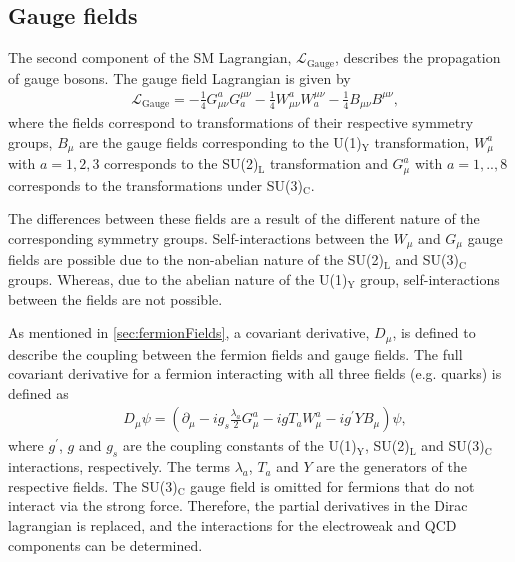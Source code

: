 \subsection{Gauge fields}\label{sec:gaugeFields}
The second component of the SM Lagrangian, $\mathcal{L}_{\mathrm{Gauge}}$, describes the propagation of gauge bosons. The gauge field Lagrangian is given by
\begin{equation}
    \label{eq:lagrangianGauge}
    \begin{aligned}
        & \mathcal{L}_\mathrm{Gauge} = -\frac{1}{4}G^a_{\mu\nu}G_a^{\mu\nu} -\frac{1}{4}W^a_{\mu\nu}W_a^{\mu\nu} -\frac{1}{4}B_{\mu\nu}B^{\mu\nu},
    \end{aligned}
\end{equation}
where the fields correspond to transformations of their respective symmetry groups, $B_\mu$ are the gauge fields corresponding to the U(1)$_\mathrm{Y}$ transformation,  $W_\mu^a$ with $a = 1,2,3$ corresponds to the SU(2)$_\mathrm{L}$ transformation and $G_\mu^a$ with $a = 1,..,8$ corresponds to the transformations under SU(3)$_\mathrm{C}$. 

The differences between these fields are a result of the different nature of the corresponding symmetry groups. Self-interactions between the $W_\mu$ and $G_\mu$ gauge fields are possible due to the non-abelian nature of the SU(2)$_\mathrm{L}$ and SU(3)$_\mathrm{C}$ groups. Whereas, due to the abelian nature of the U(1)$_\mathrm{Y}$ group, self-interactions between the fields are not possible.  

As mentioned in \cref{sec:fermionFields}, a covariant derivative, $D_\mu$, is defined to describe the coupling between the fermion fields and gauge fields. The full covariant derivative for a fermion interacting with all three fields (e.g. quarks) is defined as
\begin{equation}
    \label{eq:covaariantDerv}
    \begin{aligned}
        & D_\mu \psi = \left(\partial_\mu - ig_s\frac{\lambda_a}{2}G^a_\mu - igT_aW^a_\mu - ig^\prime YB_\mu\right)\psi,
    \end{aligned}
\end{equation}
where $g^\prime$, $g$ and $g_s$ are the coupling constants of the U(1)$_\mathrm{Y}$, SU(2)$_\mathrm{L}$ and SU(3)$_\mathrm{C}$ interactions, respectively. The terms $\lambda_a$, $T_a$ and $Y$ are the generators of the respective fields. The SU(3)$_\mathrm{C}$ gauge field is omitted for fermions that do not interact via the strong force. Therefore, the partial derivatives in the Dirac lagrangian is replaced, and the interactions for the electroweak and QCD components can be determined. 

